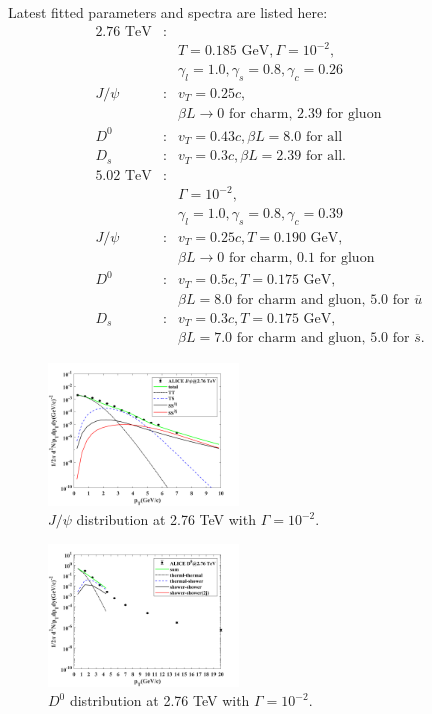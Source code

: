 \documentclass[twocolumn,aps,superscriptaddress,nofootinbib,floatfix]{revtex4}
\begin{document}
Latest fitted parameters and spectra are listed here:
\begin{eqnarray}
	\text{2.76 TeV}&:&  \nonumber \\
	&&T=0.185 \text{ GeV}, \Gamma=10^{-2}, \nonumber \\
	&&\gamma_l=1.0,  \gamma_s=0.8 ,\gamma_c=0.26\nonumber \\
	J/\psi&:& v_T=0.25c,  \\ \nonumber
	&&\beta L\rightarrow \text{0 for charm, 2.39 for gluon}\nonumber\\
	D^0&:& v_T=0.43c,  \beta L=\text{8.0 for all}\nonumber\\
	D_s&:& v_T=0.3c,    \beta L=\text{2.39 for all}.\nonumber\\
	\text{5.02 TeV}&:&  \nonumber \\
	&&\Gamma=10^{-2}, \nonumber \\
	&&\gamma_l=1.0,  \gamma_s=0.8 ,\gamma_c=0.39\nonumber \\
	J/\psi&:& v_T=0.25c,  T=0.190 \text{ GeV},\\ \nonumber
	&&\beta L\rightarrow \text{0 for charm, 0.1 for gluon}\nonumber\\
	D^0&:& v_T=0.5c,  T=0.175 \text{ GeV},\\ \nonumber
	&&\beta L=\text{8.0 for charm and gluon, 5.0 for $\overline{u}$}\nonumber\\
	D_s&:& v_T=0.3c,   T=0.175 \text{ GeV},\\ \nonumber
	&&\beta L=\text{7.0 for charm and gluon, 5.0 for $\overline{s}$}.\nonumber
\end{eqnarray}
\begin{figure}[H]
	\includegraphics[width=0.45\textwidth]{Jpsi276_230205.png}
	\caption{$J/\psi$ distribution at 2.76 TeV with $\Gamma=10^{-2}$. }
	\label{fig52}
\end{figure}
\begin{figure}[H]
	\includegraphics[width=0.45\textwidth]{D0276_230220.png}
	\caption{$D^0$ distribution at 2.76 TeV with $\Gamma=10^{-2}$. }
	\label{fig53}
\end{figure}
\end{document}
